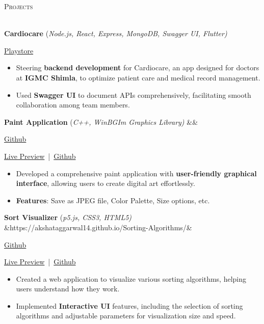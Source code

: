 \documentclass[a4paper]{article}
\newcommand{\bulletSep} { \vspace{1.5mm} }
\newcommand{\sectionSep} { \vspace{3mm} }
\newcommand{\lineunder} {
    \vspace*{-8pt} \\
    \hspace*{-15pt} \hrulefill \\
}
\newcommand{\header} [1] {
    {\hspace*{-18pt}\vspace*{6pt} {
        \fontfamily{qcs}\selectfont \large \scshape #1
    }}
    \vspace*{-6pt} \lineunder
    \vspace{1.1mm}
}
\newcommand{\linkFont}[1]{
    {\fontfamily{lmtt}\selectfont#1}
}
\newcommand{\link}[2]{
    {\fontfamily{lmtt}\selectfont\href{#1}{#2}}
}
\newcommand{\projectItem}[5]{
    {\textbf{#1}} {(\sl #2)}\hfill
    \ifx&#3&%
    \link{#4}{Github}\\
    \else
    \linkFont{\href{#3}{Live Preview}~|~\href{#4}{Github}}\\
    \fi
    \vspace{2pt}
    \begin{itemize}
        #5
    \end{itemize}
}
\newcommand{\playstoreProjectItem}[4]{
    {\textbf{#1}} {(\sl #2)}\hfill
    \linkFont{\href{#3}{Playstore}}\\
    \vspace{2pt}
    \begin{itemize}
        #4
    \end{itemize}
}
\begin{document}

\header{Projects}

\playstoreProjectItem{Cardiocare}{Node.js, React, Express, MongoDB, Swagger UI, Flutter}{https://play.google.com/store/apps/details?id=com.cardio.care}{
    \item Steering \textbf{backend development} for Cardiocare, an app designed for doctors at \textbf{IGMC Shimla}, to optimize patient care and medical record management.
    \item Used \textbf{Swagger UI} to document APIs comprehensively, facilitating smooth collaboration among team members.
}
\bulletSep


\projectItem{Paint Application}{C++, WinBGIm Graphics Library}{}{https://github.com/Sahil-187/Paint-Application}{
    \item Developed a comprehensive paint application with \textbf{user-friendly graphical interface}, allowing users to create digital art effortlessly.
    \item \textbf{Features}: Save as JPEG file, Color Palette, Size options, etc.
}
\bulletSep

\projectItem{Sort Visualizer}{p5.js, CSS3, HTML5}{https://akshataggarwal14.github.io/Sorting-Algorithms/}{https://github.com/AkshatAggarwal14/Sorting-Algorithms/}{
    \item Created a web application to visualize various sorting algorithms, helping users understand how they work.
    \item Implemented \textbf{Interactive UI} features, including the selection of sorting algorithms and adjustable parameters for visualization size and speed.
}

\sectionSep
\end{document}
